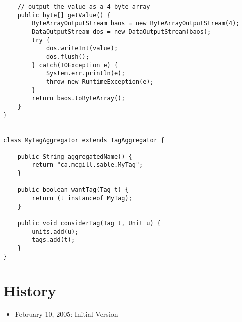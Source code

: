 \documentclass{article}
\begin{document}
\begin{verbatim}
    // output the value as a 4-byte array
    public byte[] getValue() {
        ByteArrayOutputStream baos = new ByteArrayOutputStream(4);
        DataOutputStream dos = new DataOutputStream(baos);
        try {
            dos.writeInt(value);
            dos.flush();
        } catch(IOException e) {
            System.err.println(e);
            throw new RuntimeException(e);
        }
        return baos.toByteArray();
    }
}


class MyTagAggregator extends TagAggregator {

    public String aggregatedName() {
        return "ca.mcgill.sable.MyTag";
    }

    public boolean wantTag(Tag t) {
        return (t instanceof MyTag);
    }

    public void considerTag(Tag t, Unit u) {
        units.add(u);
        tags.add(t);
    }
}
\end{verbatim}
 
\section{History}
\begin{itemize}
\item February 10, 2005: Initial Version
\end{itemize}
\end{document}
